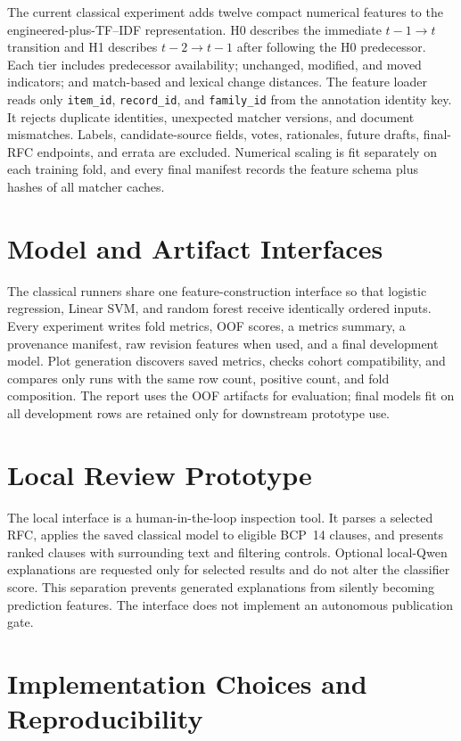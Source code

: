 \documentclass[12pt,a4paper,oneside]{report}
\begin{document}
The current classical experiment adds twelve compact numerical features to the engineered-plus-TF--IDF representation. H0 describes the immediate $t-1\!\rightarrow t$ transition and H1 describes $t-2\!\rightarrow t-1$ after following the H0 predecessor. Each tier includes predecessor availability; unchanged, modified, and moved indicators; and match-based and lexical change distances. The feature loader reads only \texttt{item\_id}, \texttt{record\_id}, and \texttt{family\_id} from the annotation identity key. It rejects duplicate identities, unexpected matcher versions, and document mismatches. Labels, candidate-source fields, votes, rationales, future drafts, final-RFC endpoints, and errata are excluded. Numerical scaling is fit separately on each training fold, and every final manifest records the feature schema plus hashes of all matcher caches.

\section{Model and Artifact Interfaces}

The classical runners share one feature-construction interface so that logistic regression, Linear SVM, and random forest receive identically ordered inputs. Every experiment writes fold metrics, OOF scores, a metrics summary, a provenance manifest, raw revision features when used, and a final development model. Plot generation discovers saved metrics, checks cohort compatibility, and compares only runs with the same row count, positive count, and fold composition. The report uses the OOF artifacts for evaluation; final models fit on all development rows are retained only for downstream prototype use.

\section{Local Review Prototype}

The local interface is a human-in-the-loop inspection tool. It parses a selected RFC, applies the saved classical model to eligible BCP~14 clauses, and presents ranked clauses with surrounding text and filtering controls. Optional local-Qwen explanations are requested only for selected results and do not alter the classifier score. This separation prevents generated explanations from silently becoming prediction features. The interface does not implement an autonomous publication gate.

\section{Implementation Choices and Reproducibility}
\end{document}
